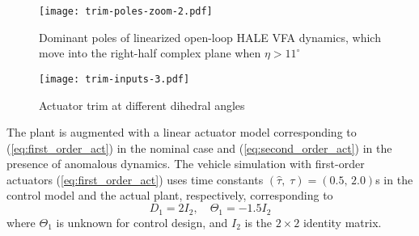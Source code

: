 \begin{figure}[htbp]
	\centering
	\texttt{[image: trim-poles-zoom-2.pdf]}
	\caption{Dominant poles of linearized open-loop HALE VFA dynamics, which move into the right-half complex plane when $\eta > 11^\circ$}
	\label{fig:trim-poles-zoom}
\end{figure}

\begin{figure}[htbp]
	\centering
	\texttt{[image: trim-inputs-3.pdf]}
	\caption{Actuator trim at different dihedral angles}
	\label{fig:trim-inputs}
\end{figure}

The plant is augmented with a linear actuator model corresponding to (\ref{eq:first_order_act}) in the nominal case and (\ref{eq:second_order_act}) in the presence of anomalous dynamics. The vehicle simulation with first-order actuators (\ref{eq:first_order_act}) uses time constants $(\hat{\tau},\;\tau) = (0.5,\,2.0)$s in the control model and the actual plant, respectively, corresponding to
\begin{equation}
D_1 = 2 I_2, \quad \Theta_1 = -1.5 I_2 \label{eq:theta_1}
\end{equation}
where $\Theta_1$ is unknown for control design, and $I_2$ is the $2 \times 2$ identity matrix. 

